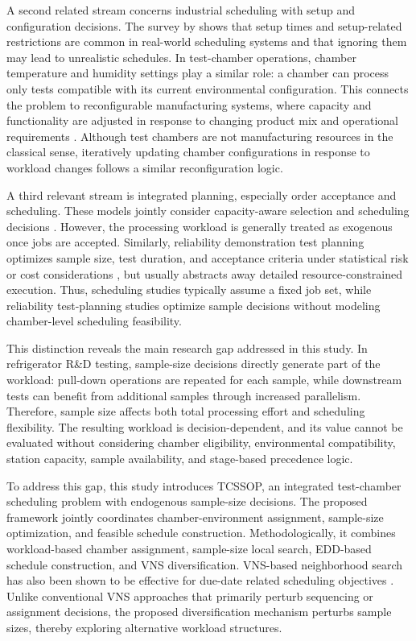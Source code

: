 \documentclass[11pt]{article}
\begin{document}
A second related stream concerns industrial scheduling with setup and configuration decisions. The survey by \citet{Allahverdi2015} shows that setup times and setup-related restrictions are common in real-world scheduling systems and that ignoring them may lead to unrealistic schedules. In test-chamber operations, chamber temperature and humidity settings play a similar role: a chamber can process only tests compatible with its current environmental configuration. This connects the problem to reconfigurable manufacturing systems, where capacity and functionality are adjusted in response to changing product mix and operational requirements \citep{Koren1999,MehrabiUlsoyKoren2000}. Although test chambers are not manufacturing resources in the classical sense, iteratively updating chamber configurations in response to workload changes follows a similar reconfiguration logic.

A third relevant stream is integrated planning, especially order acceptance and scheduling. These models jointly consider capacity-aware selection and scheduling decisions \citep{Slotnick2011,WangYe2019}. However, the processing workload is generally treated as exogenous once jobs are accepted. Similarly, reliability demonstration test planning optimizes sample size, test duration, and acceptance criteria under statistical risk or cost considerations \citep{Fernandez2022}, but usually abstracts away detailed resource-constrained execution. Thus, scheduling studies typically assume a fixed job set, while reliability test-planning studies optimize sample decisions without modeling chamber-level scheduling feasibility.

This distinction reveals the main research gap addressed in this study. In refrigerator R\&D testing, sample-size decisions directly generate part of the workload: pull-down operations are repeated for each sample, while downstream tests can benefit from additional samples through increased parallelism. Therefore, sample size affects both total processing effort and scheduling flexibility. The resulting workload is decision-dependent, and its value cannot be evaluated without considering chamber eligibility, environmental compatibility, station capacity, sample availability, and stage-based precedence logic.

To address this gap, this study introduces TCSSOP, an integrated test-chamber scheduling problem with endogenous sample-size decisions. The proposed framework jointly coordinates chamber-environment assignment, sample-size optimization, and feasible schedule construction. Methodologically, it combines workload-based chamber assignment, sample-size local search, EDD-based schedule construction, and VNS diversification.
VNS-based neighborhood search has also been shown to be effective for
due-date related scheduling objectives \citep{LiaoCheng2007}.
Unlike conventional VNS approaches that primarily perturb sequencing or assignment decisions, the proposed diversification mechanism perturbs sample sizes, thereby exploring alternative workload structures.
\end{document}
